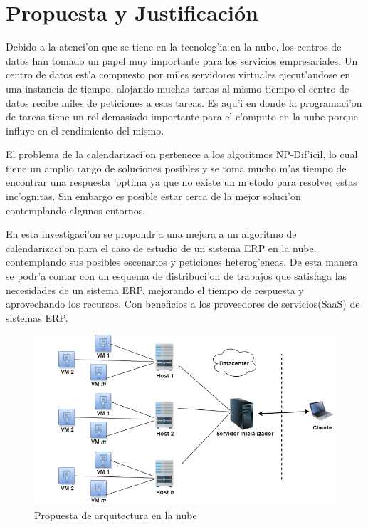 
\chapter*{Propuesta y Justificaci\'on}

Debido a la atenci'on que se tiene en la tecnolog'ia en la nube, los centros de datos han tomado un papel muy importante para los servicios empresariales.\cite{shimpy2014different} Un centro de datos est'a compuesto por miles servidores virtuales ejecut'andose en una instancia de tiempo, alojando muchas tareas al mismo tiempo el centro de datos recibe miles de peticiones a esas tareas. Es aqu'i en donde la programaci'on de tareas tiene un rol demasiado importante para el c'omputo en la nube porque influye en el rendimiento del mismo.\cite{srinivasan2014cloud} 

El problema de la calendarizaci'on pertenece a los algoritmos NP-Dif'icil, lo cual tiene un amplio rango de soluciones posibles y se toma mucho m'as tiempo de encontrar una respuesta 'optima ya que no existe un m'etodo para resolver estas inc'ognitas. Sin embargo es posible estar cerca de la mejor soluci'on contemplando algunos entornos.\cite{shimpy2014different}

En esta investigaci'on se propondr'a una mejora a un algoritmo de calendarizaci'on para el caso de estudio de un sistema ERP en la nube, contemplando sus posibles escenarios y peticiones heterog'eneas. De esta manera se podr'a contar con un esquema de distribuci'on de trabajos que satisfaga las necesidades de un sistema ERP, mejorando el tiempo de respuesta y aprovechando los recursos. Con beneficios a los proveedores de servicios(SaaS) de sistemas ERP.

\begin{figure}
	
	\centering
	\includegraphics[scale=0.5]{media/cloud2}
	\caption{Propuesta de arquitectura en la nube}
\end{figure}


